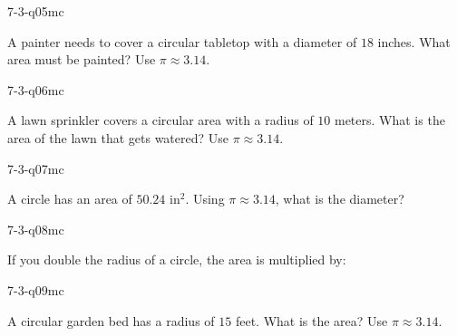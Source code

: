 \begin{practiceQuestion}{7-3-q05}{mc}
\begin{questionText}
A painter needs to cover a circular tabletop with a diameter of $18$ inches. What area must be painted? Use $\pi \approx 3.14$.
\end{questionText}
\end{practiceQuestion}

\begin{practiceQuestion}{7-3-q06}{mc}
\begin{questionText}
A lawn sprinkler covers a circular area with a radius of $10$ meters. What is the area of the lawn that gets watered? Use $\pi \approx 3.14$.
\end{questionText}
\end{practiceQuestion}

\begin{practiceQuestion}{7-3-q07}{mc}
\begin{questionText}
A circle has an area of $50.24$ in$^2$. Using $\pi \approx 3.14$, what is the diameter?
\end{questionText}
\end{practiceQuestion}

\begin{practiceQuestion}{7-3-q08}{mc}
\begin{questionText}
If you double the radius of a circle, the area is multiplied by:
\end{questionText}
\end{practiceQuestion}

\begin{practiceQuestion}{7-3-q09}{mc}
\begin{questionText}
A circular garden bed has a radius of $15$ feet. What is the area? Use $\pi \approx 3.14$.
\end{questionText}
\end{practiceQuestion}

